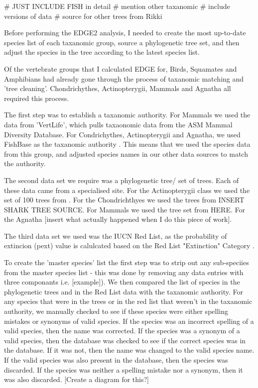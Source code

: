 \documentclass[11pt]{article}
\begin{document}


# JUST INCLUDE FISH in detail
# mention other taxanomic 
# include versions of data 
# source for other trees from Rikki 

Before performing the EDGE2 analysis, I needed to create the most up-to-date 
species list of each taxanomic group, source a phylogenetic tree set, and then 
adjust the species in the tree according to the latest species list. 

Of the vertebrate groups that I calculated EDGE for, Birds, Squamates and 
Amphibians had already gone through the process of taxanomic matching and 'tree 
cleaning'. Chondrichythes, Actinopterygii, Mammals and Agnatha all required 
this process.

The first step was to establish a taxanomic authority. For Mammals we used the 
data from 'VertLife'\autocite{}, which pulls taxaonomic data from the ASM 
Mammal Diversity Database. For Condrichythes, Actinopterygii and Agnatha, we 
used FishBase as the taxanomic authority \autocite{Fishbase} . This means that 
we used the species data from this group, and adjusted species names in our 
other data sources to match the authority. 

The second data set we require was a phylogenetic tree/ set of trees. Each of 
these data came from a specialised site. For the Actinopterygii class we used 
the set of 100 trees from \cite{Chang2019}. For the Chondrichthyes 
we used the trees from INSERT SHARK TREE SOURCE. For Mammals we used the tree 
set from HERE. For the Agnatha [insert what actually happened when I do this 
piece of work].

The third data set we used was the IUCN Red List, as the probability of 
extincion (pext) value is calulcated based on the Red List "Extinction" 
Category \autocite{IUCN2000}.

To create the 'master species' list the first step was to strip out any 
sub-speciies from the master species list - this was done by removing any data 
entries with three componants i.e. [example]). We then compared the list of 
species in the phylogenetic trees and in the Red List data 
with the taxanomic authority. For any species that were in the trees or in the 
red list that weren't in the taxanomic authority, we manually checked to see if 
these species were either spelling mistakes or synonyms of valid species. If 
the species was an incorrect spelling of a valid species, then the name was 
corrected. If the species was a synonym of a valid species, then the database 
was checked to see if the correct species was in the database. If it was not, 
then the name was changed to the valid species name. If the valid species was 
also present in the database, then the species was discarded.  If the species 
was neither a spelling mistake nor a synonym, then it was also discarded. 
[Create a diagram for this?]
\end{document}
